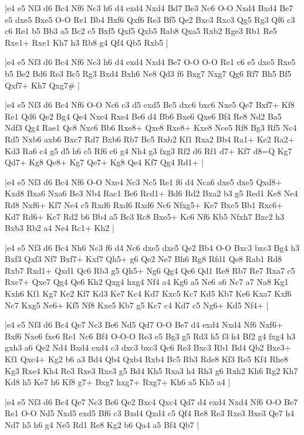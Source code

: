 \whitename{}
\blackname{}
\makegametitle
|e4 e5 Nf3 d6 Bc4 Nf6 Nc3 h6 d4 exd4 Nxd4 Bd7 Be3 Nc6 O-O Nxd4 Bxd4 Be7 e5 dxe5 Bxe5 O-O Re1 Bb4 Bxf6 Qxf6 Re3 Bf5 Qe2 Bxc3 Rxc3 Qg5 Rg3 Qf6 c3 c6 Re1 b5 Bb3 a5 Bc2 c5 Bxf5 Qxf5 Qxb5 Rab8 Qxa5 Rxb2 Rge3 Rb1 Re5 Rxe1+ Rxe1 Kh7 h3 Rb8 g4 Qf4 Qb5 Rxb5  |

\whitename{}
\blackname{}
\makegametitle
|e4 e5 Nf3 d6 Bc4 Nf6 Nc3 h6 d4 exd4 Nxd4 Be7 O-O O-O Re1 c6 e5 dxe5 Rxe5 b5 Be2 Bd6 Re3 Bc5 Rg3 Bxd4 Bxh6 Ne8 Qd3 f6 Bxg7 Nxg7 Qg6 Rf7 Bh5 Bf5 Qxf7+ Kh7 Qxg7\#  |

\whitename{}
\blackname{}
\makegametitle
|e4 e5 Nf3 d6 Bc4 Nf6 O-O Nc6 c3 d5 exd5 Bc5 dxc6 bxc6 Nxe5 Qe7 Bxf7+ Kf8 Re1 Qd6 Qe2 Bg4 Qe4 Nxe4 Rxe4 Be6 d4 Bb6 Bxe6 Qxe6 Bf4 Re8 Nd2 Ba5 Ndf3 Qg4 Rae1 Qc8 Nxc6 Bb6 Rxe8+ Qxe8 Rxe8+ Kxe8 Nce5 Rf8 Bg3 Rf5 Nc4 Rd5 Nxb6 axb6 Bxc7 Rd7 Bxb6 Rb7 Bc5 Rxb2 Kf1 Rxa2 Bb4 Ra1+ Ke2 Ra2+ Kd3 Ra6 c4 g5 d5 h6 c5 Rf6 c6 g4 Nh4 g3 fxg3 Rf2 d6 Rf1 d7+ Kf7 d8=Q Kg7 Qd7+ Kg8 Qe8+ Kg7 Qe7+ Kg8 Qe4 Kf7 Qg4 Rd1+  |

\whitename{}
\blackname{}
\makegametitle
|e4 e5 Nf3 d6 Bc4 Nf6 O-O Nxe4 Nc3 Nc5 Re1 f6 d4 Nca6 dxe5 dxe5 Qxd8+ Kxd8 Bxa6 Nxa6 Be3 Nb4 Rac1 Be6 Rcd1+ Bd6 Rd2 Bxa2 b3 g5 Red1 Ke8 Ne4 Rd8 Nxf6+ Kf7 Ne4 c5 Rxd6 Rxd6 Rxd6 Nc6 Nfxg5+ Ke7 Bxc5 Bb1 Rxc6+ Kd7 Rd6+ Kc7 Rd2 b6 Bb4 a5 Bc3 Rc8 Bxe5+ Kc6 Nf6 Kb5 Nfxh7 Bxc2 h3 Bxb3 Rb2 a4 Ne4 Rc1+ Kh2  |

\whitename{}
\blackname{}
\makegametitle
|e4 e5 Nf3 d6 Bc4 Nh6 Nc3 f6 d4 Nc6 dxe5 dxe5 Qe2 Bb4 O-O Bxc3 bxc3 Bg4 h3 Bxf3 Qxf3 Nf7 Bxf7+ Kxf7 Qh5+ g6 Qe2 Ne7 Bh6 Rg8 Rfd1 Qe8 Rab1 Rd8 Rxb7 Rxd1+ Qxd1 Qc6 Rb3 g5 Qh5+ Ng6 Qg4 Qe6 Qd1 Re8 Rb7 Re7 Rxa7 c5 Rxe7+ Qxe7 Qg4 Qe6 Kh2 Qxg4 hxg4 Nf4 a4 Kg6 a5 Ne6 a6 Nc7 a7 Na8 Kg1 Kxh6 Kf1 Kg7 Ke2 Kf7 Kd3 Ke7 Kc4 Kd7 Kxc5 Kc7 Kd5 Kb7 Ke6 Kxa7 Kxf6 Nc7 Kxg5 Ne6+ Kf5 Nf8 Kxe5 Kb7 g5 Kc7 c4 Kd7 c5 Ng6+ Kd5 Nf4+  |

\whitename{}
\blackname{}
\makegametitle
|e4 e5 Nf3 d6 Bc4 Qe7 Nc3 Be6 Nd5 Qd7 O-O Be7 d4 exd4 Nxd4 Nf6 Nxf6+ Bxf6 Nxe6 fxe6 Re1 Nc6 Bf4 O-O-O Re3 e5 Bg3 g5 Rd3 h5 f3 h4 Bf2 g4 fxg4 h3 gxh3 a6 Qe2 Nd4 Bxd4 exd4 c3 dxc3 bxc3 Qc6 Re3 Bxc3 Rb1 Bd4 Qb2 Bxe3+ Kf1 Qxc4+ Kg2 b6 a3 Bd4 Qb4 Qxb4 Rxb4 Bc5 Rb3 Rde8 Kf3 Re5 Kf4 Rhe8 Kg3 Rxe4 Kh4 Re3 Rxe3 Rxe3 g5 Bd4 Kh5 Rxa3 h4 Rh3 g6 Rxh2 Kh6 Rg2 Kh7 Kd8 h5 Ke7 h6 Kf8 g7+ Bxg7 hxg7+ Rxg7+ Kh6 a5 Kh5 a4  |

\whitename{}
\blackname{}
\makegametitle
|e4 e5 Nf3 d6 Bc4 Qe7 Nc3 Be6 Qe2 Bxc4 Qxc4 Qd7 d4 exd4 Nxd4 Nf6 O-O Be7 Re1 O-O Nd5 Nxd5 exd5 Bf6 c3 Bxd4 Qxd4 c5 Qf4 Re8 Re3 Rxe3 Bxe3 Qe7 h4 Nd7 h5 h6 g4 Ne5 Rd1 Re8 Kg2 b6 Qa4 a5 Bf4 Qb7  |

